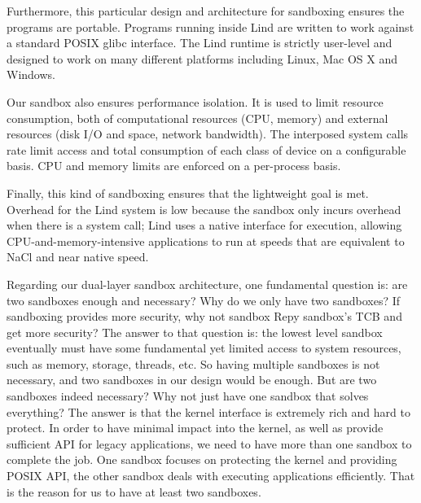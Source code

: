 Furthermore, this particular design and architecture for sandboxing ensures the programs are portable. 
Programs running inside Lind are written to work against a standard POSIX glibc interface. 
The Lind runtime is strictly user-level and designed to work on many different platforms including Linux, 
Mac OS X and Windows.

Our sandbox also ensures performance isolation. It is used to limit resource consumption, 
both of computational resources (CPU, memory) and external resources (disk I/O and space, 
network bandwidth). The interposed system calls rate limit access and total consumption of 
each class of device on a configurable basis. CPU and memory limits are enforced on 
a per-process basis. 

Finally, this kind of sandboxing ensures that the lightweight goal is met. Overhead for the Lind system 
is low because the sandbox only incurs overhead when there is a system call; Lind uses a native interface 
for execution, allowing CPU-and-memory-intensive applications to run at speeds that are equivalent 
to NaCl and near native speed. 

Regarding our dual-layer sandbox architecture, one fundamental question is: are two sandboxes 
enough and necessary? Why do we only have two sandboxes? If sandboxing provides more security, 
why not sandbox Repy sandbox's TCB and get more security? The answer to that question is: 
the lowest level sandbox eventually must have some fundamental yet limited access to system resources, 
such as memory, storage, threads, etc. So having multiple sandboxes is not necessary, and two sandboxes in 
our design would be enough. But are two sandboxes indeed necessary? Why not just have one sandbox 
that solves everything? The answer is that the kernel interface is extremely rich and hard to protect. 
In order to have minimal impact into the kernel, as well as provide sufficient API for legacy applications, 
we need to have more than one sandbox to complete the job.  One sandbox focuses on protecting 
the kernel and providing POSIX API, the other sandbox deals with executing applications efficiently. 
That is the reason for us to have at least two sandboxes.  
